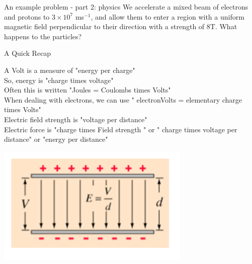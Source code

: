 \begin{frame}{An example problem - part 2: physics }
\small
We accelerate a mixed beam of electrons and protons to $3 \times 10^7$ ms$^{-1}$, and allow them to enter a region with a uniform magnetic field perpendicular to their direction with a strength of 8T. What happens to the particles?\\[21ex]

%
%
%
\end{frame}


\begin{frame}{A Quick Recap}

\small
A Volt is a measure of "energy per charge" \\[1ex]
So, energy is "charge times voltage"\\[1ex]
Often this is written "Joules = Coulombs  times Volts" \\[1ex]
When dealing with electrons, we can use " electronVolts = elementary charge times Volts"\\[2ex]

Electric field strength is "voltage per distance"\\[1ex]
Electric force is "charge times Field strength " or " charge times voltage per distance" or "energy per distance"\\[1ex]

\begin{center}
\includegraphics[scale=0.5]{millikan2}
\end{center}
\end{frame}

